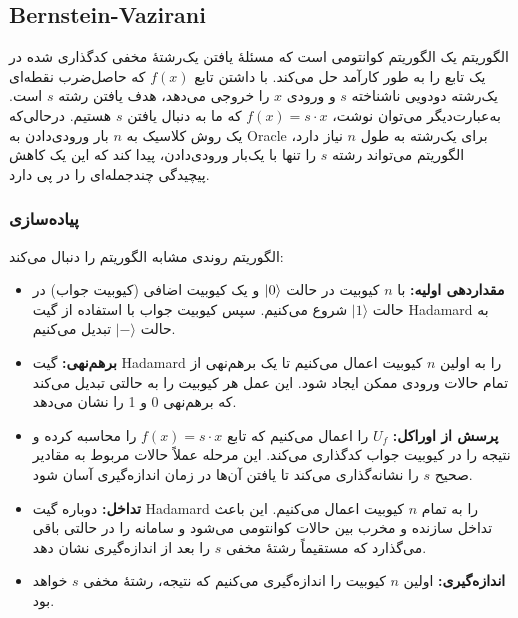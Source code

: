\subsection{Bernstein-Vazirani}
الگوریتم
یک الگوریتم کوانتومی است که مسئلهٔ یافتن یک‌رشتهٔ مخفی کدگذاری شده در یک تابع را به طور کارآمد حل می‌کند. با داشتن تابع \(f(x) \) که حاصل‌ضرب نقطه‌ای یک‌رشته دودویی ناشناخته \(s \) و ورودی \(x \) را خروجی می‌دهد، هدف یافتن رشته \(s \) است. به‌عبارت‌دیگر می‌توان نوشت، \(f(x) = s \cdot x\) که ما به دنبال یافتن \(s \) هستیم. درحالی‌که یک روش کلاسیک به \(n \) بار ورودی‌دادن به Oracle برای یک‌رشته به طول \(n \) نیاز دارد، الگوریتم
می‌تواند رشته \(s \) را تنها با یک‌بار ورودی‌دادن، پیدا کند که این یک کاهش پیچیدگی چندجمله‌ای را در پی دارد.

\subsubsection{پیاده‌سازی}
الگوریتم
روندی مشابه الگوریتم
را دنبال می‌کند:

\begin{itemize}
	\item \textbf{مقداردهی اولیه:}
	 با \( n \) کیوبیت در حالت \(\left| 0 \right\rangle \) و یک کیوبیت اضافی (کیوبیت جواب) در حالت \( \lvert 1 \rangle \) شروع می‌کنیم. سپس کیوبیت جواب با استفاده از گیت Hadamard به حالت \( \lvert - \rangle \) تبدیل می‌کنیم.
	\item \textbf{برهم‌نهی:}
	 گیت Hadamard را به اولین \( n \) کیوبیت اعمال می‌کنیم تا یک برهم‌نهی از تمام حالات ورودی ممکن ایجاد شود. این عمل هر کیوبیت را به حالتی تبدیل می‌کند که برهم‌نهی 0 و 1 را نشان می‌دهد.
	\item \textbf{پرسش از اوراکل:}
	  \( U_f \) را اعمال می‌کنیم که تابع \( f(x) = s \cdot x \) را محاسبه کرده و نتیجه را در کیوبیت جواب کدگذاری می‌کند. این مرحله عملاً حالات مربوط به مقادیر صحیح \( s \) را نشانه‌گذاری می‌کند تا یافتن آن‌ها در زمان اندازه‌گیری آسان شود.
	\item \textbf{تداخل:}
	 دوباره گیت Hadamard را به تمام \( n \) کیوبیت اعمال می‌کنیم. این باعث تداخل سازنده و مخرب بین حالات کوانتومی می‌شود و سامانه را در حالتی باقی می‌گذارد که مستقیماً رشتهٔ مخفی \( s \) را بعد از اندازه‌گیری نشان دهد.
	\item \textbf{اندازه‌گیری:}
	 اولین \( n \) کیوبیت را اندازه‌گیری می‌کنیم که نتیجه، رشته‌ٔ مخفی \( s \) خواهد بود.
\end{itemize}

